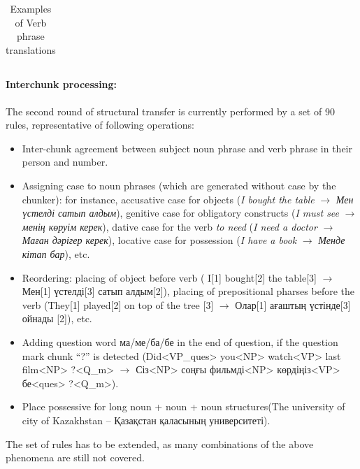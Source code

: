 \documentclass[11pt]{article}
\begin{document}
\begin{table}
\begin{tabular}{|l|l|l|l|}
     
  \end{tabular}
  \caption{Examples of Verb phrase translations}
  \label{table:vps}
\end{table}

\paragraph{Interchunk processing:}

The second round of structural transfer is currently performed by a %
set of 90 rules, representative of following operations:
\begin{itemize}
\item Inter-chunk agreement between subject noun phrase and verb phrase in their person and number.
\item Assigning case to noun phrases (which are generated without case by the chunker): for instance, 
  accusative case for objects (\emph{I bought the table} $\rightarrow$ \emph{Мен үстелді  сатып алдым}), genitive case for 
  obligatory constructs (\emph{I must see} $\rightarrow$ \emph{менің көруім керек}),  dative case for the verb \emph{to 
  need} (\emph{I need a doctor} $\rightarrow$ \emph{Маған дәрігер керек}), locative case for 
  possession (\emph{I have a book} $\rightarrow$ \emph{Менде кітап бар}), etc.\ 
\item Reordering: placing of object before verb ( I[1] bought[2] the table[3] $\rightarrow$ Мен[1] үстелді[3] сатып алдым[2]), 
  placing of prepositional pharses before the verb  (They[1] played[2] on top of the tree [3] $\rightarrow$ Олар[1] ағаштың үстінде[3] ойнады [2]), etc.\ 
\item Adding question word ма/ме/ба/бе in the end of question, if the question mark chunk ``?'' is detected (Did<VP\_ques> you<NP> watch<VP> last film<NP> ?<Q\_m> $\rightarrow$ Сіз<NP> соңғы фильмді<NP> көрдіңіз<VP> бе<ques> ?<Q\_m>).
\item Place possessive for long noun + noun + noun structures(The university of city of Kazakhstan -- Қазақстан қаласының университеті).
\end{itemize}

The set of rules has to be extended, as many combinations of the above phenomena are still not covered.
\end{document}
